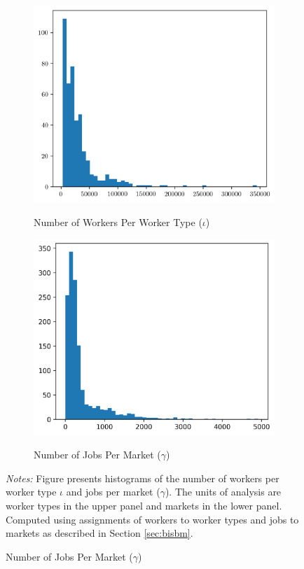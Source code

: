 \documentclass[12pt]{article}
\def\g{\gamma}
\def\i{\iota}
\theoremstyle{definition}
\theoremstyle{plain}
\begin{document}




\begin{figure}
	\centering
	\caption{Worker Type ($\i$) and Market ($\g$) Size Distributions}
	\begin{subfigure}{\textwidth}
		\centering
		\caption{Number of Workers Per Worker Type ($\i$)}
		\includegraphics[width=0.7\linewidth]{../Results/summary_stats/iota_size_distribution}
		\label{fig:iota_size_distribution}
	\end{subfigure}
	\begin{subfigure}{\textwidth}
		\centering
		\caption{Number of Jobs Per Market ($\g$)}
		\includegraphics[width=0.7\linewidth]{../Results/summary_stats/gamma_size_distribution}
		\label{fig:gamma_size_distribution}
	\end{subfigure}
	\label{fig:iota_gamma_size_distribution}
	\footnotesize\flushleft \emph{Notes:} Figure presents histograms of the number of workers per worker type $\i$ and jobs per market ($\g$). The units of analysis are worker types in the upper panel and markets in the lower panel. Computed using assignments of workers to worker types and jobs to markets as described in Section \ref{sec:bisbm}.
\end{figure}
\end{document}
